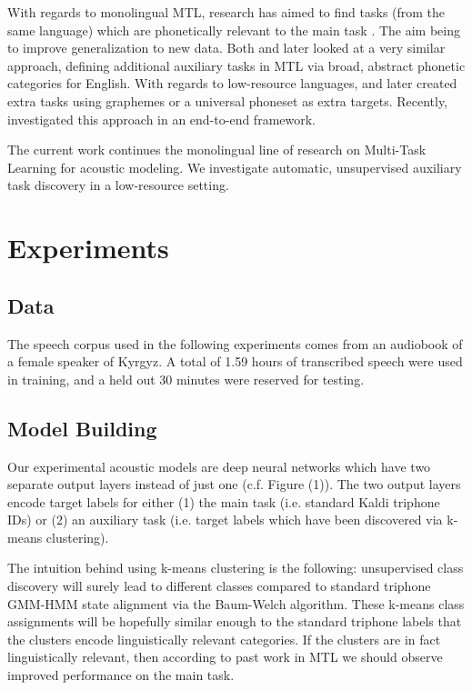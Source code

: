 \documentclass[a4paper]{article}
\begin{document}
With regards to monolingual MTL, research has aimed to find tasks (from the same language) which are phonetically relevant to the main task \cite{bell2015}. The aim being to improve generalization to new data. Both \cite{seltzer2013} and later \cite{huang2015} looked at a very similar approach, defining additional auxiliary tasks in MTL via broad, abstract phonetic categories for English. With regards to low-resource languages, \cite{chen2014} and later \cite{chen2015} created extra tasks using graphemes or a universal phoneset as extra targets. Recently, \cite{toshniwal2017multitask} investigated this approach in an end-to-end framework.

The current work continues the monolingual line of research on Multi-Task Learning for acoustic modeling. We investigate automatic, unsupervised auxiliary task discovery in a low-resource setting.


\section{Experiments}


\subsection{Data}

The speech corpus used in the following experiments comes from an audiobook of a female speaker of Kyrgyz. A total of 1.59 hours of transcribed speech were used in training, and a held out 30 minutes were reserved for testing.


\subsection{Model Building}

Our experimental acoustic models are deep neural networks which have two separate output layers instead of just one (c.f. Figure (1)). The two output layers encode target labels for either (1) the main task (i.e. standard Kaldi triphone IDs) or (2) an auxiliary task (i.e. target labels which have been discovered via k-means clustering).

The intuition behind using k-means clustering is the following: unsupervised class discovery will surely lead to different classes compared to standard triphone GMM-HMM state alignment via the Baum-Welch algorithm. These k-means class assignments will be hopefully similar enough to the standard triphone labels that the clusters encode linguistically relevant categories. If the clusters are in fact linguistically relevant, then according to past work in MTL we should observe improved performance on the main task.
\end{document}
